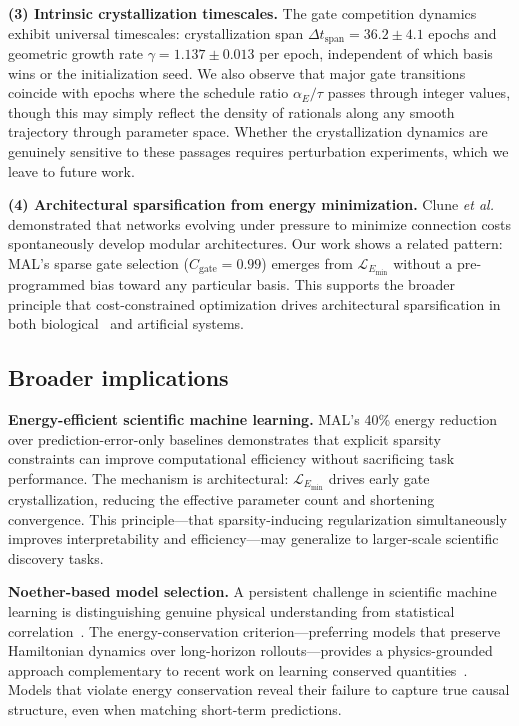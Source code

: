 \documentclass[aps,pre,reprint,superscriptaddress,longbibliography]{revtex4-2}
\begin{document}
\textbf{(3) Intrinsic crystallization timescales.} The gate competition dynamics exhibit universal timescales: crystallization span $\Delta t_{\text{span}} = 36.2 \pm 4.1$ epochs and geometric growth rate $\gamma = 1.137 \pm 0.013$ per epoch, independent of which basis wins or the initialization seed. We also observe that major gate transitions coincide with epochs where the schedule ratio $\alpha_E / \tau$ passes through integer values, though this may simply reflect the density of rationals along any smooth trajectory through parameter space. Whether the crystallization dynamics are genuinely sensitive to these passages requires perturbation experiments, which we leave to future work.

\textbf{(4) Architectural sparsification from energy minimization.} Clune \textit{et al.}~\cite{Clune2013} demonstrated that networks evolving under pressure to minimize connection costs spontaneously develop modular architectures. Our work shows a related pattern: MAL's sparse gate selection ($C_{\mathrm{gate}} = 0.99$) emerges from $\mathcal{L}_{E_{\min}}$ without a pre-programmed bias toward any particular basis. This supports the broader principle that cost-constrained optimization drives architectural sparsification in both biological~\cite{Bullmore2012} and artificial systems.

\subsection{Broader implications}
\textbf{Energy-efficient scientific machine learning.} MAL's 40\% energy reduction over prediction-error-only baselines demonstrates that explicit sparsity constraints can improve computational efficiency without sacrificing task performance. The mechanism is architectural: $\mathcal{L}_{E_{\min}}$ drives early gate crystallization, reducing the effective parameter count and shortening convergence. This principle---that sparsity-inducing regularization simultaneously improves interpretability and efficiency---may generalize to larger-scale scientific discovery tasks.

\textbf{Noether-based model selection.} A persistent challenge in scientific machine learning is distinguishing genuine physical understanding from statistical correlation~\cite{Pearl2019}. The energy-conservation criterion---preferring models that preserve Hamiltonian dynamics over long-horizon rollouts---provides a physics-grounded approach complementary to recent work on learning conserved quantities~\cite{vanderOuderaa2024, Tanaka2021}. Models that violate energy conservation reveal their failure to capture true causal structure, even when matching short-term predictions.
\end{document}
